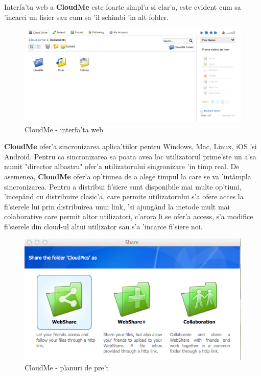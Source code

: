 \documentclass[12pt,a4paper,twoside]{report}
\begin{document}
Interfa'ta web a \textbf{CloudMe} este foarte simpl'a si clar'a, este evident cum sa 'incarci un fisier sau cum sa 'il schimbi 'in alt folder.
\begin{figure}[H]
\begin{center}
\advance\leftskip-3cm
\advance\rightskip-3cm
\includegraphics[keepaspectratio=true,scale=0.35]{img/Web-interface_CloudME.png}
\caption{CloudMe - interfa'ta web}
\label{web_cloudMe}
\end{center}
\end{figure}

\textbf{CloudMe} ofer'a sincronizarea aplica'tiilor pentru Windows, Mac, Linux, iOS 'si Android. Pentru ca sincronizarea sa poata avea loc utilizatorul prime'ste un a'sa numit "director albastru" ofer'a utilizatorului singronizare 'in timp real. De asemenea, \textbf{CloudMe} ofer'a op'tiunea de a alege timpul la care se va 'intâmpla sincronizarea.
Pentru a distribui fi'siere sunt disponibile mai multe op'tiuni, 'incepând cu distribuire clasic'a, care permite utilizatorului s'a ofere acces la fi'sierele lui prin distribuirea unui link, 'si ajungând la metode mult mai colaborative care permit altor utilizatori, c'arora li se ofer'a access, s'a modifice fi'sierele din cloud-ul altui utilizator sau s'a 'incarce fi'siere noi.

\begin{figure}[H]
\begin{center}
\advance\leftskip-3cm
\advance\rightskip-3cm
\includegraphics[keepaspectratio=true,scale=0.3]{img/Share-options_CloudME.png}
\caption{CloudMe - planuri de pre't}
\label{share_cloudMe}
\end{center}
\end{figure}
\end{document}
